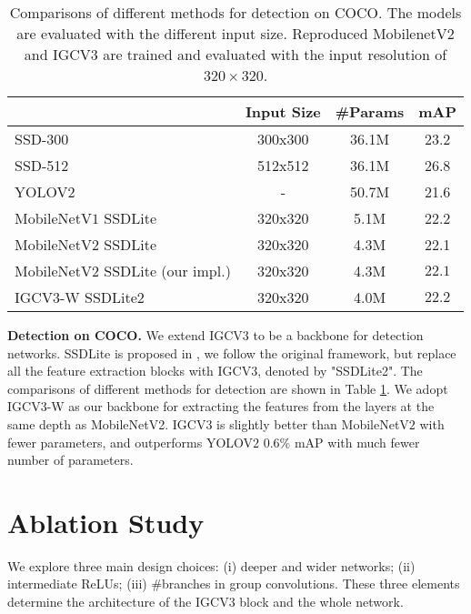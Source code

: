 \documentclass{bmvc2k}
\begin{document}
	\begin{table}[ht]
		\centering
		\begin{tabular}{|l||c|c|c|}
			\hline
			& Input Size & \#Params& mAP\\
			\hline\hline
			SSD-300 \cite{liu2016ssd}                          &300x300&36.1M&23.2\\
			SSD-512 \cite{liu2016ssd}                          &512x512&36.1M&26.8\\
			YOLOV$2$ \cite{redmon2017yolo9000}                           &-&50.7M&21.6\\
			MobileNetV$1$ SSDLite \cite{howard2017mobilenets}                 &320x320&5.1M&22.2\\
			MobileNetV$2$ SSDLite \cite{sandler2018inverted}                 &320x320&4.3M&22.1\\
			\hline\hline
			MobileNetV$2$ SSDLite (our impl.)&320x320& 4.3M & $22.1$ \\
			IGCV$3$-W SSDLite2       &320x320& 4.0M & $22.2$ \\
			\hline
		\end{tabular}
		\caption{Comparisons of different methods for detection on COCO. The models are evaluated with the different input size. Reproduced MobilenetV2 and IGCV3 are trained and evaluated with the input resolution of $320\times320$.}
		\label{det:coco}
	\end{table}
	\noindent\textbf{Detection on COCO.} We extend IGCV$3$ to be a backbone for detection networks. SSDLite is proposed in \cite{sandler2018inverted}, we follow the original framework, but replace all the feature extraction blocks with IGCV3, denoted by "SSDLite2".
	The comparisons of different methods for detection are shown in Table \ref{det:coco}. We adopt IGCV$3$-W as our backbone for extracting the features from the layers at the same depth as MobileNetV2. 
	IGCV3 is slightly better than MobileNetV$2$ with fewer parameters, and outperforms YOLOV$2$ 0.6\% mAP with much fewer number of parameters.
	
	\section{Ablation Study}
	\label{sec:ab-study}
	We explore three main design choices: (i) deeper and wider networks; 
	(ii) intermediate ReLUs; (iii) \#branches in group convolutions. These three elements determine the architecture of the IGCV3 block and the whole network.
	
\end{document}
